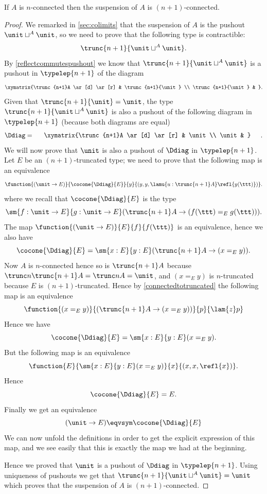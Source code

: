 %
\begin{thm} \label{thm:suspension-increases-connectedness}
  If $A$ is $n$-connected then the suspension of $A$ is $(n+1)$-connected.
\end{thm}

\begin{proof}
  We remarked in \cref{sec:colimits} that the suspension of $A$ is the pushout $\unit\sqcup^A\unit$, so we need to
  prove that the following type is contractible:
  \[\trunc{n+1}{\unit\sqcup^A\unit}.\]
  By \cref{reflectcommutespushout} we know that
  $\trunc{n+1}{\unit\sqcup^A\unit}$ is a pushout in $\typelep{n+1}$ of the diagram
  \[\xymatrix{\trunc{n+1}A \ar[d] \ar[r] & \trunc{n+1}{\unit} \\
    \trunc{n+1}{\unit} & }.\]
  Given that $\trunc{n+1}{\unit}=\unit$, the type
  $\trunc{n+1}{\unit\sqcup^A\unit}$ is also a pushout of the following diagram in
  $\typelep{n+1}$ (because both diagrams are equal)
  \[\Ddiag=\vcenter{\xymatrix{\trunc{n+1}A \ar[d] \ar[r] & \unit \\
    \unit & }}.\]
  We will now prove that $\unit$ is also a pushout of $\Ddiag$ in
  $\typelep{n+1}$.
  Let $E$ be an $(n+1)$-truncated type; we need to prove that the following map
  is an equivalence
  \[\function{(\unit \to E)}{\cocone{\Ddiag}{E}}{y}
  {(y,y,\lamu{u:{\trunc{n+1}A}} \refl{y(\ttt)})}.\]
  where we recall that $\cocone{\Ddiag}{E}$ is the type
  \[\sm{f:\unit \to E}{g:\unit \to E}(\trunc{n+1}A\to
  (f(\ttt)=_E{}g(\ttt))).\]
  The map $\function{(\unit\to E)}{E}{f}{f(\ttt)}$ is an equivalence, hence
  we also have
  \[\cocone{\Ddiag}{E}=\sm{x:E}{y:E}(\trunc{n+1}A\to(x=_Ey)).\]
  Now $A$ is $n$-connected hence so is $\trunc{n+1}A$ because
  $\trunc n{\trunc{n+1}A}=\trunc nA=\unit$, and $(x=_Ey)$ is $n$-truncated because
  $E$ is $(n+1)$-truncated. Hence by \cref{connectedtotruncated} the
  following map is an equivalence
  \[\function{(x=_Ey)}{(\trunc{n+1}A\to(x=_Ey))}{p}{\lam{z} p}\]
  Hence we have
  \[\cocone{\Ddiag}{E}=\sm{x:E}{y:E}(x=_Ey).\]
  But the following map is an equivalence
  \[\function{E}{\sm{x:E}{y:E}(x=_Ey)}{x}{(x,x,\refl{x})}.\]
  Hence
  \[\cocone{\Ddiag}{E}=E.\]
  Finally we get an equivalence
  \[(\unit \to E)\eqvsym\cocone{\Ddiag}{E}\]
  We can now unfold the definitions in order to get the explicit expression of
  this map, and we see easily that this is exactly the map we had at the
  beginning.

  Hence we proved that $\unit$ is a pushout of $\Ddiag$ in $\typelep{n+1}$. Using
  uniqueness of pushouts we get that $\trunc{n+1}{\unit\sqcup^A\unit}=\unit$
  which proves that the suspension of $A$ is $(n+1)$-connected.
\end{proof}
